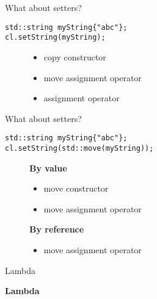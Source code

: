 \documentclass{beamer}
\begin{document}
\begin{frame}[fragile]{What about setters? }
\begin{lstlisting}[style=customcpp]
std::string myString{"abc"};
cl.setString(myString);
\end{lstlisting}
\begin{figure}[!htb]
    \centering
    \begin{minipage}{.5\textwidth}
        \centering
\begin{itemize}
\item copy constructor
\item move assignment operator
\end{itemize}
    \end{minipage}%
    \begin{minipage}{0.5\textwidth}
        \centering
\begin{itemize}
\item  assignment operator
\end{itemize}
    \end{minipage}
\end{figure}
\end{frame}


\begin{frame}[fragile]{What about setters? }

\begin{lstlisting}[style=customcpp]
std::string myString{"abc"};
cl.setString(std::move(myString));
\end{lstlisting}
\begin{figure}[!htb]
    \centering
    \begin{minipage}{.5\textwidth}
        \centering
\textbf{By value}
\begin{itemize}
\item move constructor
\item move assignment operator
\end{itemize}
    \end{minipage}%
    \begin{minipage}{0.5\textwidth}
        \centering
\textbf{By reference}
\begin{itemize}
\item move assignment operator
\end{itemize}
    \end{minipage}
\end{figure}
\end{frame}

\begin{frame}[fragile]{Lambda}
\begin{center}
{\Huge \textbf{Lambda}}
\end{center}
\end{frame}
\end{document}
